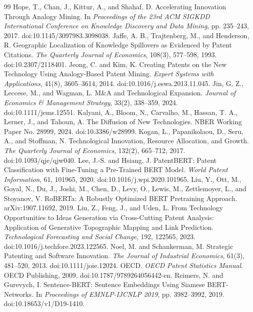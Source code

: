 \begin{thebibliography}{99}
 Hope, T., Chan, J., Kittur, A., and Shahaf, D. Accelerating Innovation Through Analogy Mining. In \textit{Proceedings of the 23rd ACM SIGKDD International Conference on Knowledge Discovery and Data Mining}, pp. 235--243, 2017. doi:10.1145/3097983.3098038.
 Jaffe, A. B., Trajtenberg, M., and Henderson, R. Geographic Localization of Knowledge Spillovers as Evidenced by Patent Citations. \textit{The Quarterly Journal of Economics}, 108(3), 577--598, 1993. doi:10.2307/2118401.
 Jeong, C. and Kim, K. Creating Patents on the New Technology Using Analogy-Based Patent Mining. \textit{Expert Systems with Applications}, 41(8), 3605--3614, 2014. doi:10.1016/j.eswa.2013.11.045.
 Jin, G. Z., Leccese, M., and Wagman, L. M\&A and Technological Expansion. \textit{Journal of Economics \& Management Strategy}, 33(2), 338--359, 2024. doi:10.1111/jems.12551.
 Kalyani, A., Bloom, N., Carvalho, M., Hassan, T. A., Lerner, J., and Tahoun, A. The Diffusion of New Technologies. NBER Working Paper No. 28999, 2024. doi:10.3386/w28999.
 Kogan, L., Papanikolaou, D., Seru, A., and Stoffman, N. Technological Innovation, Resource Allocation, and Growth. \textit{The Quarterly Journal of Economics}, 132(2), 665--712, 2017. doi:10.1093/qje/qjw040.
 Lee, J.-S. and Hsiang, J. PatentBERT: Patent Classification with Fine-Tuning a Pre-Trained BERT Model. \textit{World Patent Information}, 61, 101965, 2020. doi:10.1016/j.wpi.2020.101965.
 Liu, Y., Ott, M., Goyal, N., Du, J., Joshi, M., Chen, D., Levy, O., Lewis, M., Zettlemoyer, L., and Stoyanov, V. RoBERTa: A Robustly Optimized BERT Pretraining Approach. arXiv:1907.11692, 2019.
 Liu, Z., Feng, J., and Uden, L. From Technology Opportunities to Ideas Generation via Cross-Cutting Patent Analysis: Application of Generative Topographic Mapping and Link Prediction. \textit{Technological Forecasting and Social Change}, 192, 122565, 2023. doi:10.1016/j.techfore.2023.122565.
 Noel, M. and Schankerman, M. Strategic Patenting and Software Innovation. \textit{The Journal of Industrial Economics}, 61(3), 481--520, 2013. doi:10.1111/joie.12024.
 OECD. \textit{OECD Patent Statistics Manual}. OECD Publishing, 2009. doi:10.1787/9789264056442-en.
 Reimers, N. and Gurevych, I. Sentence-BERT: Sentence Embeddings Using Siamese BERT-Networks. In \textit{Proceedings of EMNLP-IJCNLP 2019}, pp. 3982--3992, 2019. doi:10.18653/v1/D19-1410.

\end{thebibliography}
